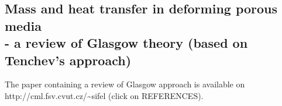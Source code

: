 \subsection{Mass and heat transfer in deforming porous media \\- a review of Glasgow theory (based on Tenchev's approach)}
\label{glasgow}
The paper containing a review of Glasgow approach is available on \textsf {http://cml.fsv.cvut.cz/\~{}sifel} 
(click on REFERENCES).